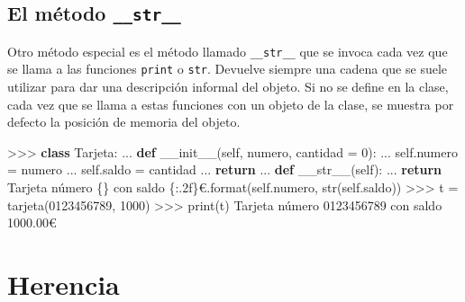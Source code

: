 \documentclass[
  spanish,
  a4paper,
]{scrreport}
\newenvironment{Shaded}{\begin{snugshade}}{\end{snugshade}}
\newcommand{\BuiltInTok}[1]{\textcolor[rgb]{0.00,0.23,0.31}{#1}}
\newcommand{\ControlFlowTok}[1]{\textcolor[rgb]{0.00,0.23,0.31}{\textbf{#1}}}
\newcommand{\DecValTok}[1]{\textcolor[rgb]{0.68,0.00,0.00}{#1}}
\newcommand{\ErrorTok}[1]{\textcolor[rgb]{0.68,0.00,0.00}{#1}}
\newcommand{\FloatTok}[1]{\textcolor[rgb]{0.68,0.00,0.00}{#1}}
\newcommand{\FunctionTok}[1]{\textcolor[rgb]{0.28,0.35,0.67}{#1}}
\newcommand{\KeywordTok}[1]{\textcolor[rgb]{0.00,0.23,0.31}{\textbf{#1}}}
\newcommand{\NormalTok}[1]{\textcolor[rgb]{0.00,0.23,0.31}{#1}}
\newcommand{\OperatorTok}[1]{\textcolor[rgb]{0.37,0.37,0.37}{#1}}
\newcommand{\SpecialCharTok}[1]{\textcolor[rgb]{0.37,0.37,0.37}{#1}}
\newcommand{\StringTok}[1]{\textcolor[rgb]{0.13,0.47,0.30}{#1}}
\newcommand{\VariableTok}[1]{\textcolor[rgb]{0.07,0.07,0.07}{#1}}
\begin{document}
\subsection{\texorpdfstring{El método
\texttt{\_\_str\_\_}}{El método \_\_str\_\_}}\label{el-muxe9todo-__str__}

Otro método especial es el método llamado \texttt{\_\_str\_\_} que se
invoca cada vez que se llama a las funciones \texttt{print} o
\texttt{str}. Devuelve siempre una cadena que se suele utilizar para dar
una descripción informal del objeto. Si no se define en la clase, cada
vez que se llama a estas funciones con un objeto de la clase, se muestra
por defecto la posición de memoria del objeto.

\begin{Shaded}
\begin{Highlighting}[]
\OperatorTok{\textgreater{}\textgreater{}\textgreater{}} \KeywordTok{class}\NormalTok{ Tarjeta:}
\NormalTok{...     }\KeywordTok{def} \FunctionTok{\_\_init\_\_}\NormalTok{(}\VariableTok{self}\NormalTok{, numero, cantidad }\OperatorTok{=} \DecValTok{0}\NormalTok{):}
\NormalTok{...         }\VariableTok{self}\NormalTok{.numero }\OperatorTok{=}\NormalTok{ numero}
\NormalTok{...         }\VariableTok{self}\NormalTok{.saldo }\OperatorTok{=}\NormalTok{ cantidad}
\NormalTok{...         }\ControlFlowTok{return}
\NormalTok{...     }\KeywordTok{def} \FunctionTok{\_\_str\_\_}\NormalTok{(}\VariableTok{self}\NormalTok{):}
\NormalTok{...         }\ControlFlowTok{return} \StringTok{\textquotesingle{}Tarjeta número }\SpecialCharTok{\{\}}\StringTok{ con saldo }\SpecialCharTok{\{:.2f\}}\StringTok{€\textquotesingle{}}\NormalTok{.}\BuiltInTok{format}\NormalTok{(}\VariableTok{self}\NormalTok{.numero, }\BuiltInTok{str}\NormalTok{(}\VariableTok{self}\NormalTok{.saldo))}
\OperatorTok{\textgreater{}\textgreater{}\textgreater{}}\NormalTok{ t }\OperatorTok{=}\NormalTok{ tarjeta(}\StringTok{\textquotesingle{}0123456789\textquotesingle{}}\NormalTok{, }\DecValTok{1000}\NormalTok{) }
\OperatorTok{\textgreater{}\textgreater{}\textgreater{}} \BuiltInTok{print}\NormalTok{(t)}
\NormalTok{Tarjeta número }\DecValTok{0}\ErrorTok{123456789}\NormalTok{ con saldo }\FloatTok{1000.00}\NormalTok{€}
\end{Highlighting}
\end{Shaded}

\section{Herencia}\label{herencia}
\end{document}
